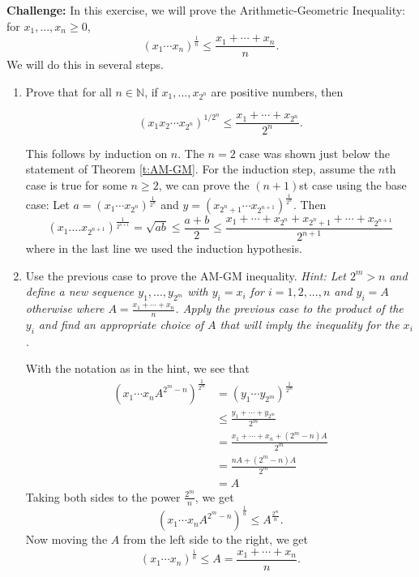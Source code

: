 \documentclass[11pt,dvipsnames]{book}
\numberwithin{figure}{section} %
\numberwithin{table}{section} %
\begin{document}
\begin{exercise}
\label{ex:AMGM}
 {\bf Challenge:} In this exercise, we will prove the Arithmetic-Geometric Inequality: for $x_{1},...,x_{n}\geq 0$,
\[
(x_{1}\cdots x_{n})^{\frac{1}{n}}\leq \frac{x_{1}+\cdots + x_{n}}{n}.
\]
We will do this in several steps.

\begin{enumerate}[label=(\alph*)]
\item Prove that for all $n\in \mathbb{N}$, if $x_{1},...,x_{2^n}$ are positive numbers, then

\[
(x_{1}x_{2}\cdots x_{2^n})^{1/2^{n}} \leq \frac{x_{1}+\cdots + x_{2^n}}{2^n}.
\]

\begin{solution}
This follows by induction on $n$. The $n=2$ case was shown just below the statement of Theorem \ref{t:AM-GM}. For the induction step, assume the $n$th case is true for some $n\geq 2$, we can prove the $(n+1)$st case using the base case: Let $a=(x_{1}\cdots x_{2^{n}})^{\frac{1}{2^{n}}}$ and $y=(x_{2^{n}+1}\cdots x_{2^{n+1}})^{\frac{1}{2^{n}}}$. Then
\[
(x_{1}....x_{2^{n+1}})^{\frac{1}{2^{n+1}}}
=\sqrt{ab}\leq \frac{a+b}{2}
\leq \frac{x_{1}+\cdots + x_{2^{n}}+x_{2^{n}+1}+\cdots + x_{2^{n+1}}}{2^{n+1}}\]
where in the last line we used the induction hypothesis.\end{solution}

\item Use  the previous case to prove the AM-GM inequality. {\it Hint: Let $2^{m}>n$ and define a new sequence $y_{1},...,y_{2^{m}}$ with $y_{i}=x_{i}$ for $i=1,2,...,n$ and $y_{i}=A$ otherwise where $A=\frac{x_{1}+\cdots + x_{n}}{n}$. Apply the previous case to the product of the $y_{i}$ and find an appropriate choice of $A$ that will imply the inequality for the $x_{i}$.}

\begin{solution}
With the notation as in the hint, we see that
\begin{align*}
(x_{1}\cdots x_{n}A^{2^{m}-n})^{\frac{1}{2^{m}}}
& = (y_{1}\cdots y_{2^{m}})^{\frac{1}{2^{m}}}\\
& \leq \frac{y_{1}+\cdots + y_{2^{m}}}{2^{m}}\\
& =\frac{x_{1}+\cdots + x_{n} + (2^{m}-n)A}{2^{m}}\\
& = \frac{nA+(2^{m}-n)A}{2^{m}}\\
& = A
\end{align*}
Taking both sides to the power $\frac{2^{m}}{n}$, we get
\[
(x_{1}\cdots x_{n}A^{2^{m}-n})^{\frac{1}{n}}
\leq A^{\frac{2^{m}}{n}}.
\]
Now moving the $A$ from the left side to the right, we get
\[
(x_{1}\cdots x_{n})^{\frac{1}{n}}\leq A=\frac{x_{1}+\cdots + x_{n}}{n}.
\]
\end{solution}
\end{enumerate}
\end{exercise}
\end{document}
